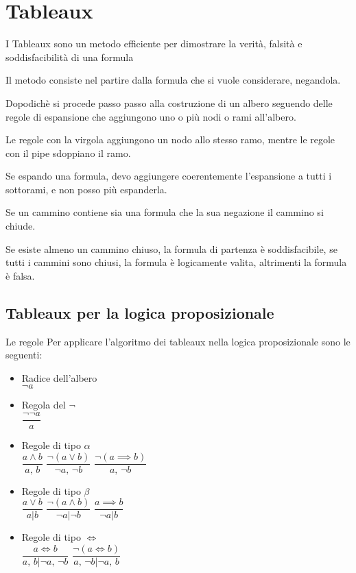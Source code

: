 \section{Tableaux}

I Tableaux sono un metodo efficiente per dimostrare la verità, falsità
e soddisfacibilità di una formula

Il metodo consiste nel partire dalla formula che si vuole considerare,
negandola.

Dopodichè si procede passo passo alla costruzione di un albero seguendo
delle regole di espansione che aggiungono uno o più nodi o rami all'albero.

Le regole con la virgola aggiungono un nodo allo stesso ramo, mentre
le regole con il pipe sdoppiano il ramo.

Se espando una formula, devo aggiungere coerentemente l'espansione
a tutti i sottorami, e non posso più espanderla.

Se un cammino contiene sia una formula che la sua negazione il cammino
si chiude.

Se esiste almeno un cammino chiuso, la formula di partenza è soddisfacibile,
se tutti i cammini sono chiusi, la formula è logicamente valita, altrimenti
la formula è falsa.


\subsection{Tableaux per la logica proposizionale}

Le regole Per applicare l'algoritmo dei tableaux nella logica proposizionale
sono le seguenti:
\begin{itemize}
\item Radice dell'albero\\
$\neg a$
\item Regola del $\neg$\\
$\dfrac{\neg\neg a}{a}$
\item Regole di tipo $\alpha$\\
$\dfrac{a\wedge b}{a,\, b}$ $\dfrac{\neg(a\vee b)}{\neg a,\,\neg b}$
$\dfrac{\neg(a\implies b)}{a,\,\neg b}$
\item Regole di tipo $\beta$\\
$\dfrac{a\vee b}{a|b}$ $\dfrac{\neg(a\wedge b)}{\neg a|\neg b}$
$\dfrac{a\implies b}{\neg a|b}$
\item Regole di tipo $\iff$\\
$\dfrac{a\iff b}{a,\, b|\neg a,\,\neg b}$ $\dfrac{\neg(a\iff b)}{a,\,\neg b|\neg a,\, b}$
\end{itemize}

